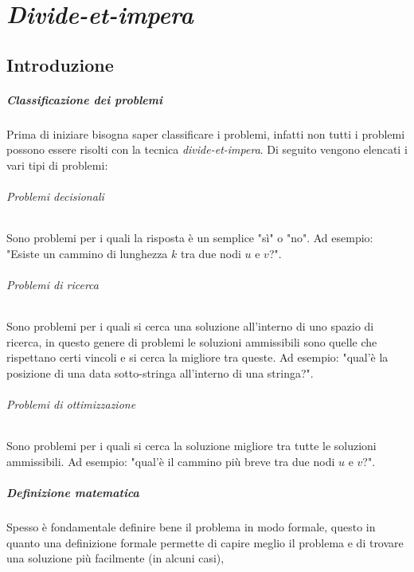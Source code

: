 \chapter{\textit{Divide-et-impera}}
\label{ch:divideEtImpera}
\thispagestyle{chapterInit}
\section{Introduzione}
    \paragraph{Classificazione dei problemi}
        Prima di iniziare bisogna saper classificare i problemi, infatti non tutti i problemi possono essere risolti con la tecnica \textit{divide-et-impera}. Di seguito vengono elencati i vari tipi di problemi:
        \subparagraph{Problemi decisionali} Sono problemi per i quali la risposta è un semplice "sì" o "no". Ad esempio: "Esiste un cammino di lunghezza $k$ tra due nodi $u$ e $v$?".
        \subparagraph{Problemi di ricerca} Sono problemi per i quali si cerca una soluzione all'interno di uno spazio di ricerca, in questo genere di problemi le soluzioni ammissibili sono quelle che rispettano certi vincoli e si cerca la migliore tra queste. Ad esempio: "qual'è la posizione di una data sotto-stringa all'interno di una stringa?".
        \subparagraph{Problemi di ottimizzazione} Sono problemi per i quali si cerca la soluzione migliore tra tutte le soluzioni ammissibili. Ad esempio: "qual'è il cammino più breve tra due nodi $u$ e $v$?".
    \paragraph{Definizione matematica}
        Spesso è fondamentale definire bene il problema in modo formale, questo in quanto una definizione formale permette di capire meglio il problema e di trovare una soluzione più facilmente (in alcuni casi),
